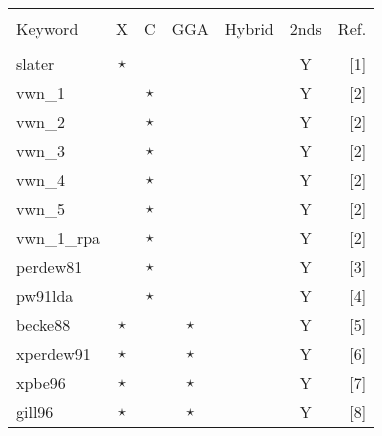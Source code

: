 %
\twocolumn
\begin{table}[htp]

\begin{tabular}{|l|ccccc|r|}
\hline
           &          &             &        &         &      &   \\
Keyword    & X        & C           & GGA    &  Hybrid & 2nds & Ref.\\
           &          &             &        &         &      &   \\
\hline
 slater     & $\star$    &            &         &      &  Y   &[1]\\
\hline                                                  
vwn\_1     &          &   $\star$     &         &      &  Y   &[2]     \\
vwn\_2     &          &   $\star$     &         &      &  Y   &[2]    \\
vwn\_3     &          &   $\star$     &         &      &  Y   &[2]     \\
vwn\_4     &          &   $\star$     &         &      &  Y   &[2]     \\
vwn\_5     &          &   $\star$     &         &      &  Y   &[2]     \\
vwn\_1\_rpa&          &   $\star$     &         &      &  Y   &[2]     \\
perdew81   &          &   $\star$     &         &      &  Y   &[3]     \\
pw91lda    &          &   $\star$     &         &      &  Y   &[4]\\
\hline                                                  
becke88    & $\star$    &             &  $\star$  &        &  Y   &[5]\\
xperdew91  & $\star$    &             &  $\star$  &        &  Y   &[6]\\
xpbe96     & $\star$    &             &  $\star$  &        &  Y   &[7]\\
gill96     & $\star$    &             &  $\star$  &        &  Y   &[8]\\

\end{tabular}
\end{table}
